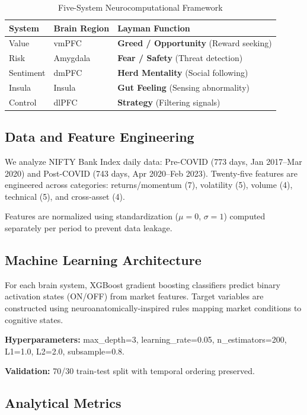 \documentclass[conference]{IEEEtran}
\begin{document}
\begin{table}[htbp]
\centering
\caption{Five-System Neurocomputational Framework}
\label{tab:brain-systems}
\small
\begin{tabular}{@{}lll@{}}
\toprule
\textbf{System} & \textbf{Brain Region} & \textbf{Layman Function} \\
\midrule
Value & vmPFC & \textbf{Greed / Opportunity} (Reward seeking) \\
Risk & Amygdala & \textbf{Fear / Safety} (Threat detection) \\
Sentiment & dmPFC & \textbf{Herd Mentality} (Social following) \\
Insula & Insula & \textbf{Gut Feeling} (Sensing abnormality) \\
Control & dlPFC & \textbf{Strategy} (Filtering signals) \\
\bottomrule
\end{tabular}
\end{table}

\subsection{Data and Feature Engineering}

We analyze NIFTY Bank Index daily data: Pre-COVID (773 days, Jan 2017–Mar 2020) and Post-COVID (743 days, Apr 2020–Feb 2023). Twenty-five features are engineered across categories: returns/momentum (7), volatility (5), volume (4), technical (5), and cross-asset (4).

Features are normalized using standardization ($\mu=0$, $\sigma=1$) computed separately per period to prevent data leakage.

\subsection{Machine Learning Architecture}

For each brain system, XGBoost gradient boosting classifiers predict binary activation states (ON/OFF) from market features. Target variables are constructed using neuroanatomically-inspired rules mapping market conditions to cognitive states.

\textbf{Hyperparameters:} max\_depth=3, learning\_rate=0.05, n\_estimators=200, L1=1.0, L2=2.0, subsample=0.8.

\textbf{Validation:} 70/30 train-test split with temporal ordering preserved.

\subsection{Analytical Metrics}
\end{document}
